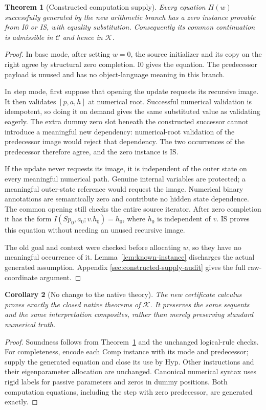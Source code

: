 \documentclass[11pt,letterpaper]{article}
\newtheorem{theorem}{Theorem}[section]
\newtheorem{corollary}[theorem]{Corollary}
\theoremstyle{definition}\newtheorem{definition}[theorem]{Definition}
\theoremstyle{remark}\newtheorem{remark}[theorem]{Remark}
\newcommand{\Kcal}{\mathcal K}
\newcommand{\Ccal}{\mathcal C}
\begin{document}
\begin{theorem}[Constructed computation supply]
\label{thm:new-supply}
Every equation $H(w)$ successfully generated by the new arithmetic
branch has a zero instance provable from I0 or IS, with equality
substitution. Consequently its common continuation is admissible in
$\Ccal$ and hence in $\Kcal$.
\end{theorem}
\begin{proof}
In base mode, after setting $w=0$, the source initializer and its copy on
the right agree by structural zero completion. I0 gives the equation.
The predecessor payload is unused and has no object-language meaning
in this branch.

In step mode, first suppose that opening the update requests its recursive
image. It then validates $[p,a,h]$ at numerical root. Successful numerical
validation is idempotent, so doing it on demand gives the same substituted
value as validating eagerly. The extra dummy zero slot beneath the
constructed successor cannot introduce a meaningful new dependency:
numerical-root validation of the predecessor image would reject that
dependency. The two occurrences of the predecessor therefore agree, and
the zero instance is IS.

If the update never requests its image, it is independent of the outer
state on every meaningful numerical path. Genuine internal variables
are protected; a meaningful outer-state reference would request the
image. Numerical binary annotations are semantically zero and contribute
no hidden state dependence. The common opening still checks the entire
source iterator. After zero completion it has the form
$I(Sp_0,a_0;v.h_0)=h_0$, where $h_0$ is independent of $v$. IS proves
this equation without needing an unused recursive image.

The old goal and context were checked before allocating $w$, so they
have no meaningful occurrence of it. Lemma~\ref{lem:known-instance}
discharges the actual generated assumption. Appendix
\ref{sec:constructed-supply-audit} gives the full raw-coordinate argument.
\end{proof}

\begin{corollary}[No change to the native theory]
The new certificate calculus proves exactly the closed native theorems
of $\Kcal$. It preserves the same sequents and the same interpretation
composites, rather than merely preserving standard numerical truth.
\end{corollary}
\begin{proof}
Soundness follows from Theorem~\ref{thm:new-supply} and the unchanged
logical-rule checks. For completeness, encode each Comp instance with
its mode and predecessor; supply the generated equation and close its
use by Hyp. Other instructions and their eigenparameter allocation are
unchanged. Canonical numerical syntax uses rigid labels for passive
parameters and zeros in dummy positions. Both computation equations,
including the step with zero predecessor, are generated exactly.
\end{proof}
\end{document}
